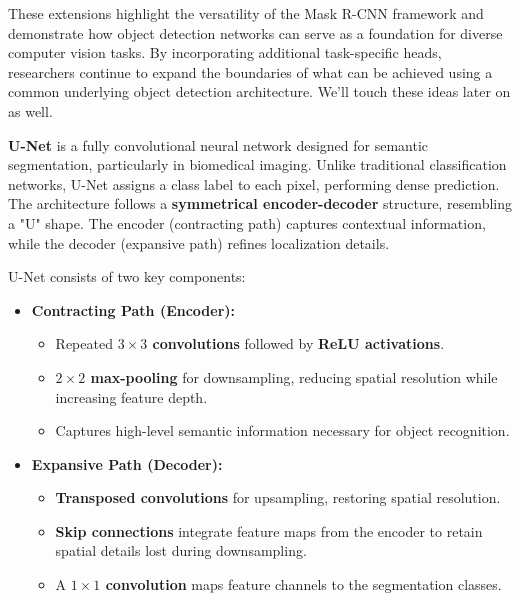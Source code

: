 \noindent These extensions highlight the versatility of the Mask R-CNN framework and demonstrate how object detection networks can serve as a foundation for diverse computer vision tasks. By incorporating additional task-specific heads, researchers continue to expand the boundaries of what can be achieved using a common underlying object detection architecture. We'll touch these ideas later on as well. 

\newpage
\begin{enrichment}
	\label{enr:chapter15_unet}
	
	\begin{enrichment}[Overview][subsection]
		
		\noindent \textbf{U-Net} \cite{ronneberger2015_unet} is a fully convolutional neural network designed for semantic segmentation, particularly in biomedical imaging. Unlike traditional classification networks, U-Net assigns a class label to each pixel, performing dense prediction. The architecture follows a \textbf{symmetrical encoder-decoder} structure, resembling a "U" shape. The encoder (contracting path) captures contextual information, while the decoder (expansive path) refines localization details.
		
	\end{enrichment}
	
	\begin{enrichment}
		\noindent U-Net consists of two key components:
		
		\begin{itemize}
			\item \textbf{Contracting Path (Encoder):} 
			\begin{itemize}
				\item Repeated \textbf{$3 \times 3$ convolutions} followed by \textbf{ReLU activations}.
				\item \textbf{$2 \times 2$ max-pooling} for downsampling, reducing spatial resolution while increasing feature depth.
				\item Captures high-level semantic information necessary for object recognition.
			\end{itemize}
			
			\item \textbf{Expansive Path (Decoder):} 
			\begin{itemize}
				\item \textbf{Transposed convolutions} for upsampling, restoring spatial resolution.
				\item \textbf{Skip connections} integrate feature maps from the encoder to retain spatial details lost during downsampling.
				\item A \textbf{$1 \times 1$ convolution} maps feature channels to the segmentation classes.
			\end{itemize}
		\end{itemize}
		

\end{enrichment}
\end{enrichment}
